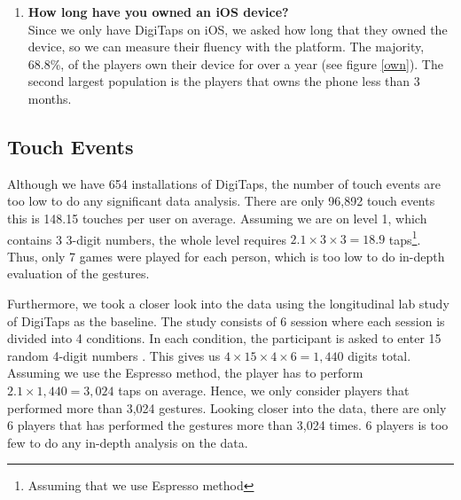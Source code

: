 \begin{enumerate}
  \item \textbf{How long have you owned an iOS device?} \\
  Since we only have DigiTaps on iOS, we asked how long that they owned the device, so we can measure their fluency with the platform. The majority, 68.8\%, of the players own their device for over a year (see figure \ref{own}). The second largest population is the players that owns the phone less than 3 months.

\end{enumerate}

\subsection{Touch Events}
Although we have 654 installations of DigiTaps, the number of touch events are too low to do any significant data analysis. There are only 96,892 touch events this is 148.15 touches per user on average. Assuming we are on level 1, which contains 3 3-digit numbers, the whole level requires $2.1 \times 3 \times 3 = 18.9$ taps\footnote{Assuming that we use Espresso method}. Thus, only 7 games were played for each person, which is too low to do in-depth evaluation of the gestures.

Furthermore, we took a closer look into the data using the longitudinal lab study of DigiTaps as the baseline. The study consists of 6 session where each session is divided into 4 conditions. In each condition, the participant is asked to enter 15 random 4-digit numbers \cite{Azenkot:2013}. This gives us $4 \times 15 \times 4 \times 6 = 1,440$ digits total. Assuming we use the Espresso method, the player has to perform $2.1 \times 1,440 = 3,024$ taps on average. Hence, we only consider players that performed more than 3,024 gestures. Looking closer into the data, there are only 6 players that has performed the gestures more than 3,024 times. 6 players is too few to do any in-depth analysis on the data. 
